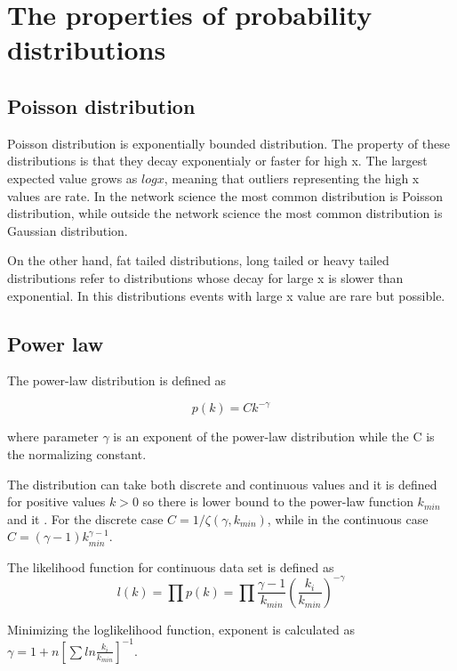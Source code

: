 \section{The properties of probability distributions}

\subsection{Poisson distribution}

Poisson distribution is exponentially bounded distribution. The property of these distributions is that they decay exponentialy or faster for high x. The largest expected value grows as $logx$, meaning that outliers representing the high x values are rate. In the network science the most common distribution is Poisson distribution, while outside the network science the most common distribution is Gaussian distribution. 

On the other hand, fat tailed distributions, long tailed or heavy tailed distributions refer to distributions whose decay for large x is slower than exponential. In this distributions events with large x value are rare but possible. 

\subsection{Power law}

The power-law distribution is defined as 

\begin{equation}
p(k) = C k^{-\gamma}
\end{equation}

where parameter $\gamma$ is an exponent of the power-law distribution while the C is the normalizing constant. 

The distribution can take both discrete and continuous values and it is defined for positive values $k>0$ so there is lower bound to the power-law function $k_{min}$ and it . For the discrete case $C=1/\zeta(\gamma, k_{min})$, while in the continuous case $C=(\gamma-1)k_{min}^{\gamma-1}$. 

The likelihood function for continuous data set is defined as 
\begin{equation}
l(k) = \prod p(k) = \prod \frac{\gamma - 1}{ k_{min}}(\frac{k_i}{k_{min}})^{-\gamma}
\end{equation}

Minimizing the loglikelihood function, exponent is calculated as $\gamma = 1+n[\sum ln \frac{k_i}{k_{min}} ]^{-1}$. 

